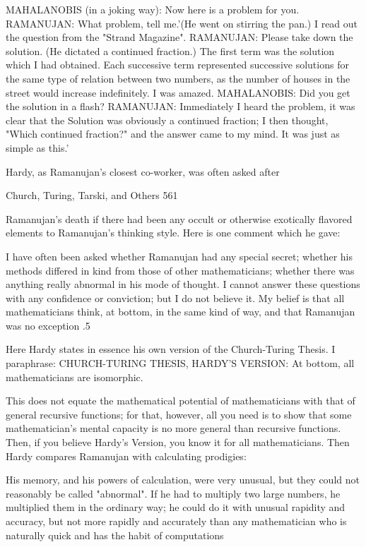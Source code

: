 {   MAHALANOBIS (in a joking way): Now here is a problem for you.
   RAMANUJAN: What problem, tell me.'(He went on stirring the pan.) I read out the
   question from the "Strand Magazine".
   RAMANUJAN: Please take down the solution. (He dictated a continued fraction.)
        The first term was the solution which I had obtained. Each successive term
   represented successive solutions for the same type of relation between two numbers,
   as the number of houses in the street would increase indefinitely. I was amazed.
   MAHALANOBIS: Did you get the solution in a flash?
   RAMANUJAN: Immediately I heard the problem, it was clear that the Solution was
   obviously a continued fraction; I then thought, "Which continued fraction?" and the
   answer came to my mind. It was just as simple as this.'

Hardy, as Ramanujan's closest co-worker, was often asked after

Church, Turing, Tarski, and Others                                                       561

Ramanujan's death if there had been any occult or otherwise exotically flavored elements
to Ramanujan's thinking style. Here is one comment which he gave:

  I have often been asked whether Ramanujan had any special secret; whether his
  methods differed in kind from those of other mathematicians; whether there was
  anything really abnormal in his mode of thought. I cannot answer these questions
  with any confidence or conviction; but I do not believe it. My belief is that all
  mathematicians think, at bottom, in the same kind of way, and that Ramanujan was
  no exception .5

Here Hardy states in essence his own version of the Church-Turing Thesis. I paraphrase:
CHURCH-TURING THESIS, HARDY'S VERSION: At bottom, all mathematicians are
isomorphic.

This does not equate the mathematical potential of mathematicians with that of general
recursive functions; for that, however, all you need is to show that some mathematician's
mental capacity is no more general than recursive functions. Then, if you believe Hardy's
Version, you know it for all mathematicians.
Then Hardy compares Ramanujan with calculating prodigies:

  His memory, and his powers of calculation, were very unusual, but they could not
  reasonably be called "abnormal". If he had to multiply two large numbers, he
  multiplied them in the ordinary way; he could do it with unusual rapidity and
  accuracy, but not more rapidly and accurately than any mathematician who is
  naturally quick and has the habit of computations

}
